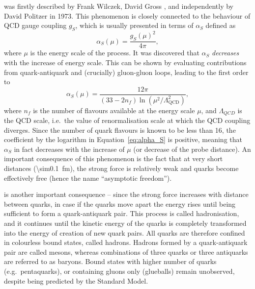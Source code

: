 \begin{description}[wide=\parindent]
\item [Asymptotic freedom] was firstly described by Frank Wilczek, David Gross \autocite{Gross_Wilczek}, and
independently by David Politzer \autocite{Politzer} in 1973. This phenomenon is closely connected to the behaviour of
QCD gauge coupling $g_S$, which is usually presented in terms of $\alpha_S$ defined as
\begin{equation}
\alpha_S (\mu) = \frac{g_S (\mu)^2}{4 \pi},
\end{equation}
where $\mu$ is the energy scale of the process. It was discovered that $\alpha_S$ \textit{decreases} with the increase
of energy scale. This can be shown by evaluating contributions from quark-antiquark and (crucially) gluon-gluon loops,
leading to the first order to \autocite{Griffiths}
\begin{equation}
\alpha_S (\mu) = \frac{12\pi}{(33-2n_f) \ln(\mu^2/\Lambda_{\text{QCD}}^2)},
\label{eq:alpha_S}
\end{equation}
where $n_f$ is the number of flavours available at the energy scale $\mu$, and $\Lambda_{QCD}$ is the QCD scale, i.e.\
the value of renormalisation scale at which the QCD coupling diverges. Since the number of quark flavours is known to be
less than 16, the coefficient by the logarithm in Equation~\ref{eq:alpha_S} is positive, meaning that $\alpha_S$ in fact
decreases with the increase of $\mu$ (or decrease of the probe distance). An important consequence of this phenomenon is
the fact that at very short distances (\SI{\sim0.1}{\femto\metre}), the strong force is relatively weak and quarks
become effectively free (hence the name ``asymptotic freedom'').

\item [Colour confinement] is another important consequence -- since the strong force increases with distance between
quarks, in case if the quarks move apart the energy rises until being sufficient to form a quark-antiquark pair. This
process is called hadronisation, and it continues until the kinetic energy of the quarks is completely transformed into
the energy of creation of new quark pairs. All quarks are therefore confined in colourless bound states, called hadrons.
Hadrons formed by a quark-antiquark pair are called mesons, whereas combinations of three quarks or three antiquarks are
referred to as baryons. Bound states with higher number of quarks (e.g.\ pentaquarks), or containing gluons only
(glueballs) remain unobserved, despite being predicted by the Standard Model.

\end{description}

